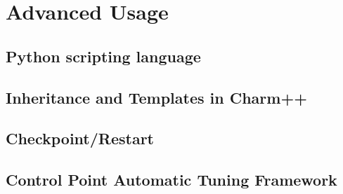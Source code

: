 \documentclass[10pt]{report}
\begin{document}
\part{Advanced Usage}

  
  
  
  
  
  
  
  
  
  
      
      
%  
  

\chapter{Python scripting language}
\label{python}
  

\chapter{Inheritance and Templates in Charm++}
\label{inheritance and templates}
  

%

\chapter{Checkpoint/Restart}
\label{sec:checkpoint}
  

\chapter{Control Point Automatic Tuning Framework}
\label{sec:controlpoint}
  

\appendix


%






\end{document}
